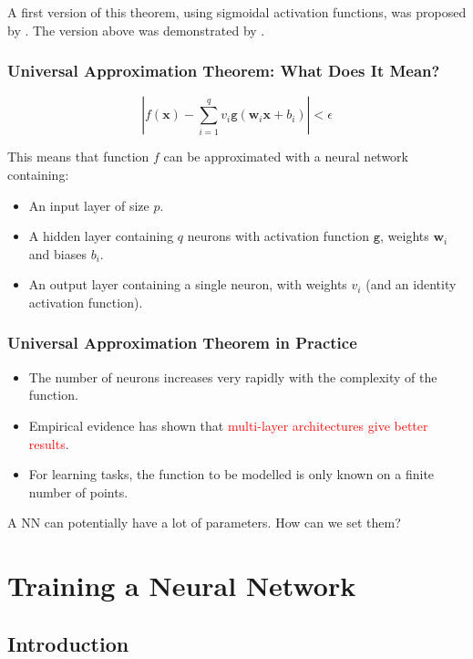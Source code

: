 \documentclass{book}
\newcommand{\x}{\mathbf{x}}
\newcommand{\act}{\texttt{g}}%
\newcommand{\alert}[1]{\textcolor{red}{#1}}
\begin{document}
A first version of this theorem, using sigmoidal activation functions, was proposed by \cite{cybenko_approximations_1989}. The version above was demonstrated by \cite{hornik_approximation_1991}.

\subsection{Universal Approximation Theorem: What Does It Mean?}

\[
\left| f(\x) - \sum\limits_{i=1}^q v_i \act(\mathbf{w}_i\x + b_i) \right| < \epsilon
\]

This means that function $f$ can be approximated with a neural network containing:
\begin{itemize}
\item An input layer of size $p$.
\item A hidden layer containing $q$ neurons with activation function $\act$, weights $\mathbf{w}_i$ and biases $b_i$.
\item An output layer containing a single neuron, with weights $v_i$ (and an identity activation function).
\end{itemize}

\subsection{Universal Approximation Theorem in Practice}

\begin{itemize}
\item The number of neurons increases very rapidly with the complexity of the function.
\item Empirical evidence has shown that \alert{multi-layer architectures give better results}.
\item For learning tasks, the function to be modelled is only known on a finite number of points.
\end{itemize}

\begin{block}{}
A NN can potentially have a lot of parameters. How can we set them?
\end{block}

\chapter{Training a Neural Network}

\section{Introduction}
\end{document}
